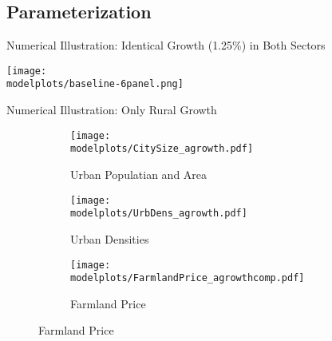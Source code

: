 \documentclass[aspectratio=169]{beamer}
\begin{document}
\subsection{Parameterization}



\begin{frame}{Numerical Illustration: Identical Growth (1.25\%) in Both Sectors}

	\begin{adjustbox}{center}
		\texttt{[image: \\modelplots/baseline-6panel.png]}
	\end{adjustbox}
	
\end{frame}

\begin{frame}{Numerical Illustration: Only Rural Growth}
\begin{figure}
	
	\begin{subfigure}[t]{0.32\textwidth}
		\begin{centering}
			\texttt{[image: \\modelplots/CitySize\_agrowth.pdf]}
			\caption{Urban Populatian and Area}
		\end{centering}
	\end{subfigure}
	\hfill
	\begin{subfigure}[t]{0.32\textwidth}
		\begin{centering}
			\texttt{[image: \\modelplots/UrbDens\_agrowth.pdf]}
			\caption{Urban Densities}
		\end{centering}
	\end{subfigure}
	\hfill
	\begin{subfigure}[t]{0.32\textwidth}
		\begin{centering}
			\texttt{[image: \\modelplots/FarmlandPrice\_agrowthcomp.pdf]}\end{centering}
			\caption{Farmland Price}
	\end{subfigure}
\end{figure}
\end{frame}
\end{document}
